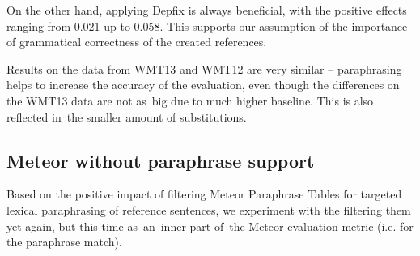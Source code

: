 \documentclass[11pt]{article}
\begin{document}
\begin{table}[tb]
\begin{center}

\vspace{10pt}

\caption{Average number of replaced words/phrases per sentence.}
\label{lrec_replaced}
\end{center}
\end{table}

On the other hand, applying Depfix is always beneficial, with the positive 
effects ranging from 0.021 up to 0.058. This supports our assumption of the 
importance of grammatical correctness of the created references.

Results on the data from WMT13 and WMT12 are very similar -- paraphrasing 
helps to increase the accuracy of the evaluation, even though the differences 
on the WMT13 data are not as~big due to much higher baseline. This is also 
reflected in~the smaller amount of substitutions.

\subsection{Meteor without paraphrase support}
\label{parmesan}
Based on the positive impact of filtering Meteor Paraphrase Tables for targeted
lexical paraphrasing of reference sentences, we experiment with the filtering 
them yet again, but this time as~an~inner part of~the Meteor evaluation metric 
(i.e. for the paraphrase match).
\end{document}

